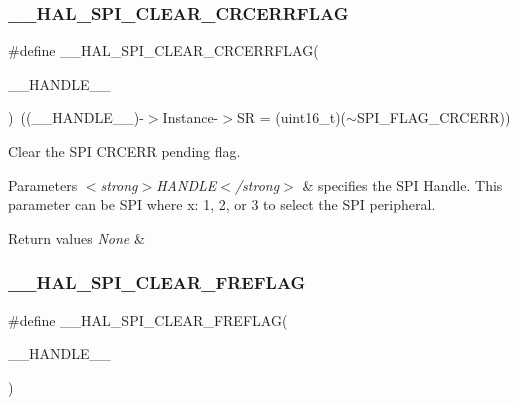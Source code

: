\subsubsection{\texorpdfstring{\+\_\+\+\_\+\+H\+A\+L\+\_\+\+S\+P\+I\+\_\+\+C\+L\+E\+A\+R\+\_\+\+C\+R\+C\+E\+R\+R\+F\+L\+AG}{\_\_HAL\_SPI\_CLEAR\_CRCERRFLAG}}
{\footnotesize\ttfamily \#define \+\_\+\+\_\+\+H\+A\+L\+\_\+\+S\+P\+I\+\_\+\+C\+L\+E\+A\+R\+\_\+\+C\+R\+C\+E\+R\+R\+F\+L\+AG(\begin{DoxyParamCaption}\item[{}]{\+\_\+\+\_\+\+H\+A\+N\+D\+L\+E\+\_\+\+\_\+ }\end{DoxyParamCaption})~((\+\_\+\+\_\+\+H\+A\+N\+D\+L\+E\+\_\+\+\_\+)-\/$>$Instance-\/$>$SR = (uint16\+\_\+t)($\sim$S\+P\+I\+\_\+\+F\+L\+A\+G\+\_\+\+C\+R\+C\+E\+RR))}



Clear the S\+PI C\+R\+C\+E\+RR pending flag. 


\begin{DoxyParams}{Parameters}
{\em $<$strong$>$\+H\+A\+N\+D\+L\+E$<$/strong$>$} & specifies the S\+PI Handle. This parameter can be S\+PI where x\+: 1, 2, or 3 to select the S\+PI peripheral. \\
\hline
\end{DoxyParams}

\begin{DoxyRetVals}{Return values}
{\em None} & \\
\hline
\end{DoxyRetVals}
\mbox{\label{group___s_p_i___exported___macros_ga7ff182f5cf6c731318c882351d6d7ac2}} 
\subsubsection{\texorpdfstring{\+\_\+\+\_\+\+H\+A\+L\+\_\+\+S\+P\+I\+\_\+\+C\+L\+E\+A\+R\+\_\+\+F\+R\+E\+F\+L\+AG}{\_\_HAL\_SPI\_CLEAR\_FREFLAG}}
{\footnotesize\ttfamily \#define \+\_\+\+\_\+\+H\+A\+L\+\_\+\+S\+P\+I\+\_\+\+C\+L\+E\+A\+R\+\_\+\+F\+R\+E\+F\+L\+AG(\begin{DoxyParamCaption}\item[{}]{\+\_\+\+\_\+\+H\+A\+N\+D\+L\+E\+\_\+\+\_\+ }\end{DoxyParamCaption})}

